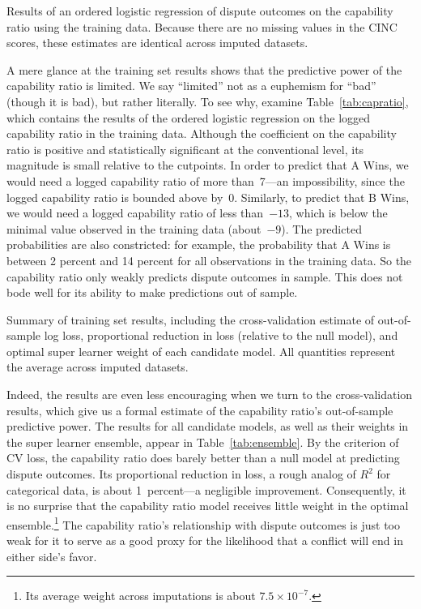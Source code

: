 \begin{table}[tp]
  \centering
  
  \caption{
    Results of an ordered logistic regression of dispute outcomes on the capability ratio using the training data.
    Because there are no missing values in the CINC scores, these estimates are identical across imputed datasets.
  }
  \label{tab:capratio}
\end{table}

A mere glance at the training set results shows that the predictive power of the capability ratio is limited.
We say ``limited'' not as a euphemism for ``bad'' (though it is bad), but rather literally.
To see why, examine Table~\ref{tab:capratio}, which contains the results of the ordered logistic regression on the logged capability ratio in the training data.
Although the coefficient on the capability ratio is positive and statistically significant at the conventional level, its magnitude is small relative to the cutpoints.
In order to predict that A Wins, we would need a logged capability ratio of more than~7---an impossibility, since the logged capability ratio is bounded above by~0.
Similarly, to predict that B Wins, we would need a logged capability ratio of less than~$-13$, which is below the minimal value observed in the training data (about~$-9$).
The predicted probabilities are also constricted: for example, the probability that A Wins is between 2 percent and 14 percent for all observations in the training data.
So the capability ratio only weakly predicts dispute outcomes in sample.
This does not bode well for its ability to make predictions out of sample.

\begin{table}[tp]
  \centering
  
  \caption{
    Summary of training set results, including the cross-validation estimate of out-of-sample log loss, proportional reduction in loss (relative to the null model), and optimal super learner weight of each candidate model.
    All quantities represent the average across imputed datasets.
  }
  \label{tab:ensemble}
\end{table}

Indeed, the results are even less encouraging when we turn to the cross-validation results, which give us a formal estimate of the capability ratio's out-of-sample predictive power.
The results for all candidate models, as well as their weights in the super learner ensemble, appear in Table~\ref{tab:ensemble}.
By the criterion of CV loss, the capability ratio does barely better than a null model at predicting dispute outcomes.
Its proportional reduction in loss, a rough analog of $R^2$ for categorical data, is about 1~percent---a negligible improvement.
Consequently, it is no surprise that the capability ratio model receives little weight in the optimal ensemble.\footnote{
  Its average weight across imputations is about $7.5 \times 10^{-7}$.
}
The capability ratio's relationship with dispute outcomes is just too weak for it to serve as a good proxy for the likelihood that a conflict will end in either side's favor.

